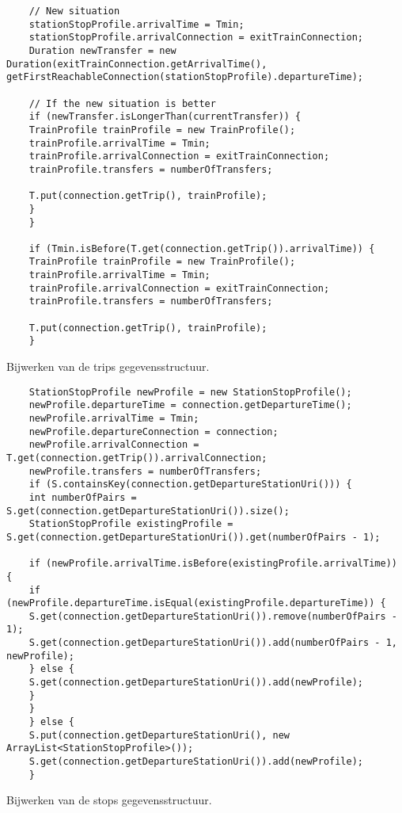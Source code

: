 \begin{appendices}
\begin{listing}[h]
\begin{verbatim}
	// New situation
	stationStopProfile.arrivalTime = Tmin;
	stationStopProfile.arrivalConnection = exitTrainConnection;
	Duration newTransfer = new Duration(exitTrainConnection.getArrivalTime(), getFirstReachableConnection(stationStopProfile).departureTime);
	
	// If the new situation is better
	if (newTransfer.isLongerThan(currentTransfer)) {
	TrainProfile trainProfile = new TrainProfile();
	trainProfile.arrivalTime = Tmin;
	trainProfile.arrivalConnection = exitTrainConnection;
	trainProfile.transfers = numberOfTransfers;
	
	T.put(connection.getTrip(), trainProfile);
	}
	}
	
	if (Tmin.isBefore(T.get(connection.getTrip()).arrivalTime)) {
	TrainProfile trainProfile = new TrainProfile();
	trainProfile.arrivalTime = Tmin;
	trainProfile.arrivalConnection = exitTrainConnection;
	trainProfile.transfers = numberOfTransfers;
	
	T.put(connection.getTrip(), trainProfile);
	}
	\end{verbatim}
	\caption[CSA: Bijwerken T]{Bijwerken van de trips gegevensstructuur.}
	\label{code:2:csaT}
\end{listing}

\begin{listing}[h]
	\begin{verbatim}
	StationStopProfile newProfile = new StationStopProfile();
	newProfile.departureTime = connection.getDepartureTime();
	newProfile.arrivalTime = Tmin;
	newProfile.departureConnection = connection;
	newProfile.arrivalConnection = T.get(connection.getTrip()).arrivalConnection;
	newProfile.transfers = numberOfTransfers;
	if (S.containsKey(connection.getDepartureStationUri())) {
	int numberOfPairs = S.get(connection.getDepartureStationUri()).size();
	StationStopProfile existingProfile = S.get(connection.getDepartureStationUri()).get(numberOfPairs - 1);
	
	if (newProfile.arrivalTime.isBefore(existingProfile.arrivalTime)) {
	if (newProfile.departureTime.isEqual(existingProfile.departureTime)) {
	S.get(connection.getDepartureStationUri()).remove(numberOfPairs - 1);
	S.get(connection.getDepartureStationUri()).add(numberOfPairs - 1, newProfile);
	} else {
	S.get(connection.getDepartureStationUri()).add(newProfile);
	}
	}
	} else {
	S.put(connection.getDepartureStationUri(), new ArrayList<StationStopProfile>());
	S.get(connection.getDepartureStationUri()).add(newProfile);
	}
	\end{verbatim}
	\caption[CSA: Bijwerken S]{Bijwerken van de stops gegevensstructuur.}
	\label{code:2:csaS}
\end{listing}


\end{appendices}
